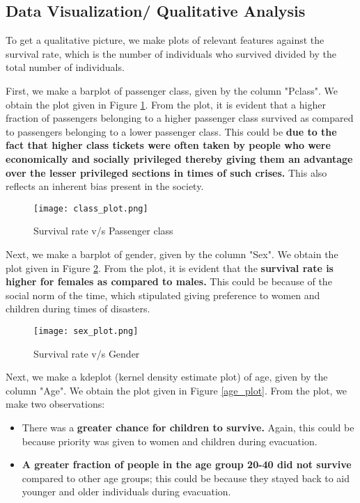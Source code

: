 \documentclass[conference]{IEEEtran}
\begin{document}
\subsection{Data Visualization/ Qualitative Analysis}

To get a qualitative picture, we make plots of relevant features against the survival rate, which is the number of individuals who survived divided by the total number of individuals.

First, we make a barplot of passenger class, given by the column "Pclass". We obtain the plot given in Figure \ref{class_plot}. From the plot, it is evident that a higher fraction of passengers belonging to a higher passenger class survived as compared to passengers belonging to a lower passenger class. This could be \textbf{ due to the fact that higher class tickets were often taken by people who were economically and socially privileged thereby giving them an advantage over the lesser privileged sections in times of such crises.} This also reflects an inherent bias present in the society.

\begin{figure}[tbh]
\centering
\texttt{[image: class\_plot.png]}
\caption{Survival rate v/s Passenger class}
\label{class_plot}
\end{figure}

Next, we make a barplot of gender, given by the column "Sex". We obtain the plot given in Figure \ref{sex_plot}. From the plot, it is evident that the \textbf{survival rate is higher for females as compared to males.} This could be because of the social norm of the time, which stipulated giving preference to women and children during times of disasters.

\begin{figure}[tbh]
\centering
\texttt{[image: sex\_plot.png]}
\caption{Survival rate v/s Gender}
\label{sex_plot}
\end{figure}

Next, we make a kdeplot (kernel density estimate plot) of age, given by the column "Age". We obtain the plot given in Figure \ref{age_plot}. From the plot, we make two observations:

\begin{itemize}
    \item There was a \textbf{greater chance for children to survive.} Again, this could be because priority was given to women and children during evacuation.
    \item \textbf{A greater fraction of people in the age group 20-40 did not survive} compared to other age groups; this could be because they stayed back to aid younger and older individuals during evacuation.
\end{itemize}
\end{document}
